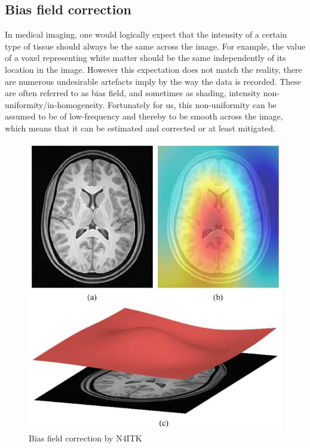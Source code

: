 \subsection{Bias field correction}
In medical imaging, one would logically expect that the intensity of a certain type of tissue should always be the same across the image. For example, the value of a voxel representing white matter should be the same independently of its location in the image. However this expectation does not match the reality, there are numerous undesirable artefacts imply by the way the data is recorded. These are often referred to as bias field, and sometimes as shading, intensity non-uniformity/in-homogeneity.  Fortunately for us, this non-uniformity can be assumed to be of low-frequency and thereby to be smooth across the image, which means that it can be estimated and corrected or at least mitigated.
\begin{figure}
 \centering
 \includegraphics[width=.9\linewidth]{figures/preprocessing/N4_explain.jpeg}
 \captionsetup{width=.9\linewidth}
 \caption[N4]{Bias field correction by N4ITK\footnotemark}
 \label{fig:N4_explain}
\end{figure}


